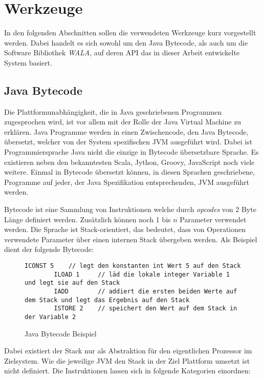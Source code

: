 \chapter{Werkzeuge}

In den folgenden Abschnitten sollen die verwendeten Werkzeuge kurz vorgestellt werden. Dabei handelt es 
sich sowohl um den Java Bytecode, als auch um die Software Bibliothek \textit{WALA}, auf deren API das 
in dieser Arbeit entwickelte System basiert. 

\section{Java Bytecode}

Die Plattformunabhängigkeit, die in Java geschriebenen Programmen zugesprochen wird, 
ist vor allem mit der Rolle der Java Virtual Machine zu erklären. Java Programme werden 
in einen Zwischencode, den Java Bytecode, übersetzt, welcher von der System spezifischen 
JVM ausgeführt wird. Dabei ist Programmiersprache Java nicht die einzige in Bytecode 
übersetzbare Sprache. Es existieren neben den bekanntesten Scala, Jython, Groovy,
JavaScript noch viele weitere. Einmal in Bytecode übersetzt können, in diesen Sprachen 
geschriebene, Programme auf jeder, der Java Spezifikation entsprechenden, JVM ausgeführt 
werden. 

Bytecode ist eine Sammlung von Instruktionen welche durch \textit{opcodes} von 2 Byte Länge definiert 
werden. Zusätzlich können noch 1 bis $n$ Parameter verwendet werden. Die Sprache ist Stack-orientiert, das 
bedeutet, dass von Operationen verwendete Parameter über einen internen Stack übergeben werden. Als Beispiel 
dient der folgende Bytecode:

\begin{figure}[H]
	\begin{lstlisting}[language=Bytecode]
		ICONST 5 	// legt den konstanten int Wert 5 auf den Stack 
		ILOAD 1		// läd die lokale integer Variable 1 und legt sie auf den Stack
		IADD 		// addiert die ersten beiden Werte auf dem Stack und legt das Ergebnis auf den Stack
		ISTORE 2	// speichert den Wert auf dem Stack in der Variable 2
	\end{lstlisting} 
	\caption{Java Bytecode Beispiel}
\end{figure}

Dabei existiert der Stack nur als Abstraktion für den eigentlichen Prozessor im Zielsystem. Wie die 
jeweilige JVM den Stack in der Ziel Plattform umsetzt ist nicht definiert. Die Instruktionen lassen sich in 
folgende Kategorien einordnen:

